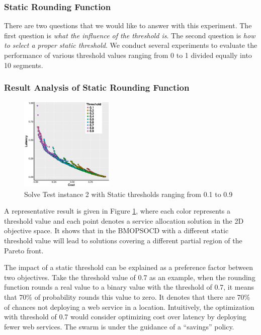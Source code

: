 \documentclass[10pt,journal,compsoc]{IEEEtran}
\begin{document}
\subsubsection{Static Rounding Function}
\label{sec:static_exp}
There are two questions that we would like to answer with this experiment. The first question is \textit{what the influence of the threshold is}. The second question is \textit{how to select a proper static threshold}. We conduct several experiments to evaluate the performance of various threshold values ranging from 0 to 1 divided equally into 10 segments. 

\subsubsection{Result Analysis of Static Rounding Function}
\label{sec:result_static}
\begin{figure}[h!]
	\centering
	\includegraphics[width=0.40\textwidth]{pics/static_threshold_problem_extra2.png}
	\caption{Solve Test instance 2 with Static thresholds ranging from 0.1 to 0.9}
	\label{fig:fullThreshold}
\end{figure}

A representative result is given in Figure \ref{fig:fullThreshold}, where each color represents a threshold value and each point denotes a service allocation solution in the 2D objective space. It shows that in the BMOPSOCD with a different static threshold value will lead to solutions covering a different partial region of the Pareto front. 

The impact of a static threshold can be explained as a preference factor between two objectives. Take the threshold value of 0.7 as an example, 
when the rounding function rounds a real value to a binary value with the threshold of 0.7, it means that 70\% of probability rounds this value to zero. It denotes that there are 70\% of chances not deploying a web service in a location. 
Intuitively, the optimization with threshold of 0.7 would consider optimizing cost over latency by deploying fewer web services. The swarm is under the 
guidance of a ``savings'' policy. 
\end{document}
